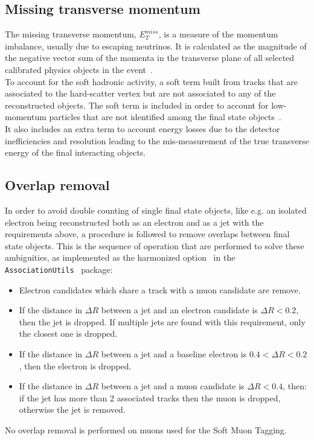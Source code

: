 \subsection{Missing transverse momentum}
\label{sec:object:met}
The missing transverse momentum, $E^{miss}_{T}$, is a measure of the momentum
imbalance, usually due to escaping neutrinos. 
It is calculated as the magnitude of the negative vector sum of the momenta 
in the transverse plane of all selected calibrated physics objects in the event~\cite{MTM1,MTM2}. \\
To account for the soft hadronic activity, a soft term built from
tracks that are associated to the hard-scatter vertex but are not
associated to any of the reconstructed objects. The soft term is
included in order to account for low-momentum particles that are not
identified among the final state objects~\cite{PERF-2011-07,PERF-2014-04,ATL-PHYS-PUB-2015-027}.\\
It also includes an extra term to account energy losses due to the detector inefficiencies 
and resolution leading to the mis-measurement of the true transverse energy of the final 
interacting objects.

\subsection{Overlap removal}
\label{sec:object:over_rem}
In order to avoid double counting of single final state objects, like e.g. an 
isolated electron being reconstructed both as an electron and as a jet with the 
requirements above, a procedure is followed to remove overlaps between final state objects. 
This is the sequence of operation that are performed to solve these ambiguities, as 
implemented as the harmonized option~\cite{Adams:1743654} in the \texttt{AssociationUtils}~\cite{AssociationUtils} package:
\begin{itemize}
	\item Electron candidates which share a track with a muon candidate are remove.
	\item If the distance in $\Delta R$ between a jet and an electron candidate 
	is $\Delta R < 0.2$, then the jet is dropped. If multiple jets are found with this requirement, 
	only the closest one is dropped.
	\item If the distance in $\Delta R$ between a jet and a baseline
	electron is $0.4 < \Delta R < 0.2$, 
	then the electron is dropped.
	\item If the distance in $\Delta R$ between a jet and a muon
	candidate is $\Delta R < 0.4$, then: if 
	the jet has more than 2 associated tracks then the muon is dropped, otherwise the jet is removed.
\end{itemize}
No overlap removal is performed on muons used for the Soft Muon Tagging.


\label{soft_mu}


\clearpage
